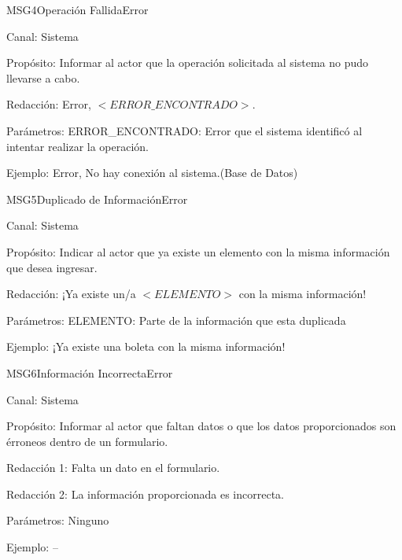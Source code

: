\begin{mensaje}{MSG4}{Operación Fallida}{Error \msgError}
	\item[Canal:] Sistema
    \item[Propósito:] Informar al actor que la operación solicitada al sistema no pudo llevarse a cabo.
    \item[Redacción:] Error, $<ERROR\_ENCONTRADO>$.
    \item[Parámetros:] ERROR\_ENCONTRADO: Error que el sistema identificó al intentar realizar la operación.
    \item[Ejemplo:] Error, No hay conexión al sistema.(Base de Datos)
\end{mensaje}

\begin{mensaje}{MSG5}{Duplicado de Información}{Error \msgError}
	\item[Canal:] Sistema
    \item[Propósito:] Indicar al actor que ya existe un elemento con la misma información que desea ingresar.
    \item[Redacción:] ¡Ya existe un/a $<ELEMENTO>$ con la misma información!
    \item[Parámetros:] ELEMENTO: Parte de la información que esta duplicada
    \item[Ejemplo:]¡Ya existe una boleta con la misma información!
\end{mensaje}

\begin{mensaje}{MSG6}{Información Incorrecta}{Error  \msgError}
	\item[Canal:] Sistema
	\item[Propósito:] Informar al actor que faltan datos o que los datos proporcionados son érroneos dentro de un formulario.
	\item[Redacción 1:] Falta un dato en el formulario.
	\item[Redacción 2:] La información proporcionada es incorrecta.
	\item[Parámetros:] Ninguno
	\item[Ejemplo:] --
\end{mensaje}

